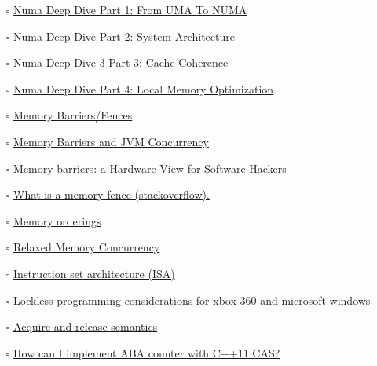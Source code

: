 \documentclass[openany, a4paper]{book}
\theoremstyle{plain}
\theoremstyle{definition}
\theoremstyle{remark}
\begin{document}
\begin{itemize}
\item[{$\square$}] \href{https://frankdenneman.nl/2016/07/07/numa-deep-dive-part-1-uma-numa/}{Numa Deep Dive Part 1: From UMA To NUMA}
\item[{$\square$}] \href{https://frankdenneman.nl/2016/07/08/numa-deep-dive-part-2-system-architecture/}{Numa Deep Dive Part 2: System Architecture}
\item[{$\square$}] \href{https://frankdenneman.nl/2016/07/11/numa-deep-dive-part-3-cache-coherency/}{Numa Deep Dive 3 Part 3: Cache Coherence}
\item[{$\square$}] \href{https://frankdenneman.nl/2016/07/13/numa-deep-dive-4-local-memory-optimization/}{Numa Deep Dive Part 4: Local Memory Optimization}
\item[{$\square$}] \href{https://mechanical-sympathy.blogspot.com/2011/07/memory-barriersfences.html}{Memory Barriers/Fences}
\item[{$\square$}] \href{https://www.infoq.com/articles/memory\_barriers\_jvm\_concurrency/}{Memory Barriers and JVM Concurrency}
\item[{$\square$}] \href{http://www.rdrop.com/users/paulmck/scalability/paper/whymb.2010.07.23a.pdf}{Memory barriers: a Hardware View for Software Hackers}
\item[{$\square$}] \href{https://stackoverflow.com/questions/286629/what-is-a-memory-fence}{What is a memory fence (stackoverflow).}
\item[{$\square$}] \href{https://en.wikipedia.org/wiki/Memory\_ordering\#Compile-time\_memory\_ordering}{Memory orderings}
\item[{$\square$}] \href{https://www.cl.cam.ac.uk/\~pes20/weakmemory/}{Relaxed Memory Concurrency}
\item[{$\square$}] \href{https://en.wikipedia.org/wiki/Instruction\_set\_architecture\#Instructions}{Instruction set architecture (ISA)}
\item[{$\square$}] \href{https://docs.microsoft.com/en-us/windows/win32/dxtecharts/lockless-programming?redirectedfrom=MSDN}{Lockless programming considerations for xbox 360 and microsoft windows}
\item[{$\square$}] \href{https://preshing.com/20120913/acquire-and-release-semantics/}{Acquire and release semantics}
\item[{$\square$}] \href{https://stackoverflow.com/questions/38984153/how-can-i-implement-aba-counter-with-c11-cas/38991835\#38991835}{How can I implement ABA counter with C++11 CAS?}

\end{itemize}
\end{document}
